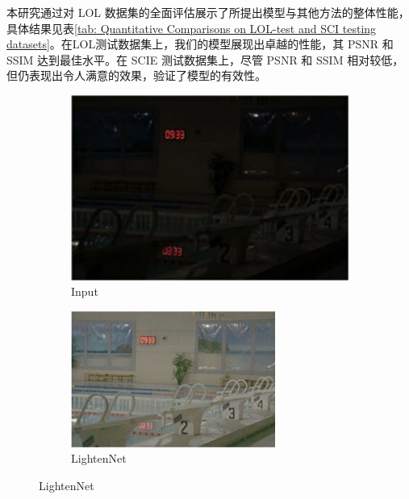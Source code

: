 \documentclass[a4paper]{ctexart}
\begin{document}
	本研究通过对 LOL 数据集的全面评估展示了所提出模型与其他方法的整体性能，具体结果见表\ref{tab: Quantitative Comparisons on LOL-test and SCI testing datasets}。在LOL测试数据集上，我们的模型展现出卓越的性能，其 PSNR 和 SSIM 达到最佳水平。在 SCIE 测试数据集上，尽管 PSNR 和 SSIM 相对较低，但仍表现出令人满意的效果，验证了模型的有效性。
	
	\begin{figure}[htb] 
		\centering 
		\begin{subfigure}{0.19\textwidth}
			\includegraphics[width=\linewidth]{picture/LLIE/Efficent/Input}
			\captionsetup{font=scriptsize}
			\caption{Input}
			\label{fig: LLI Input}
		\end{subfigure}
		\begin{subfigure}{0.19\textwidth}
			\includegraphics[width=\linewidth]{picture/LLIE/Efficent/LightenNet}
			\captionsetup{font=scriptsize}
			\caption{LightenNet}

\end{subfigure}
\end{figure}
\end{document}
